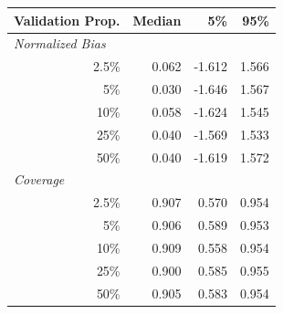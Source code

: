 
\begin{tabular}{r|rrr}
\toprule
Validation Prop. & Median & 5\% & 95\%\\
\midrule
\multicolumn{1}{l|}{\textit{Normalized Bias}}\\
2.5\% & 0.062 & -1.612 & 1.566\\
5\% & 0.030 & -1.646 & 1.567\\
10\% & 0.058 & -1.624 & 1.545\\
25\% & 0.040 & -1.569 & 1.533\\
50\% & 0.040 & -1.619 & 1.572\\
\midrule
%
\multicolumn{1}{l|}{\textit{Coverage}}\\
2.5\% & 0.907 & 0.570 & 0.954\\
5\% & 0.906 & 0.589 & 0.953\\
10\% & 0.909 & 0.558 & 0.954\\
25\% & 0.900 & 0.585 & 0.955\\
50\% & 0.905 & 0.583 & 0.954\\
\bottomrule
\end{tabular}
